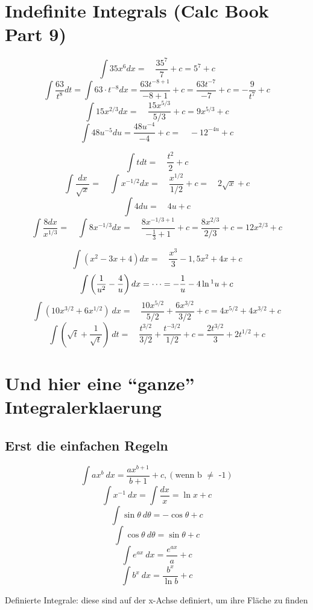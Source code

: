 \documentclass{report}
\begin{document}
\begin{multicols}{2}
\end{multicols}


\section{Indefinite Integrals (Calc Book Part 9)}

\[\int 35 x^6 dx =\quad \frac{35^7}{7}+c = 5^7+c\]
\[\int \frac{63}{t^8}dt = \int 63\cdot t^{-8} dx = \frac{63t^{-8+1}}{-8+1}+c= \frac{63t^{-7}}{-7}+c = -\frac{9}{t^7}+c\]
\[\int 15x^{2/3}dx=\quad \frac{15x^{5/3}}{5/3}+c = 9x^{5/3}+c\]
\[\int 48u^{-5}du= \frac{48u^{-4}}{-4}+c =\quad -12^{-4u}+c\]

\[\int t dt =\quad \frac{t^2}{2}+c\]
\[\int \frac{dx}{\sqrt{x}}=\quad \int x^{-1/2}dx =\quad \frac{x^{1/2}}{1/2}+c=\quad 2\sqrt{x}+c\]
\[\int 4 du =\quad 4u+c\]
\[\int \frac{8dx}{x^{1/3}} =\quad \int 8x^{-1/3}dx =\quad \frac{8x^{-1/3+1}}{-\frac{1}{3}+1}+c = \frac{8x^{2/3}}{2/3}+c = 12x^{2/3}+c \]

\[\int (x^2-3x+4)dx =\quad \frac{x^3}{3}-1,5x^2+4x+c\]
\[\int \left(\frac{1}{u^2}-\frac{4}{u}\right)dx = \dots = -\frac{1}{u}-4\ln\footnote{Recall that a power of $b=-1$ is a special case : $\int \frac{du}{u}=\int u^{-1}du=\ln u+c$} u+c \]
\[\int (10x^{3/2}+6x^{1/2})\ dx =\quad \frac{10x^{5/2}}{5/2}+\frac{6x^{3/2}}{3/2}+c = 4x^{5/2}+4x^{3/2}+c\]
\[\int \left(\sqrt{t}+\frac{1}{\sqrt{t}}\right)\ dt =\quad \frac{t^{3/2}}{3/2}+\frac{t^{-3/2}}{1/2}+c= \frac{2t^{3/2}}{3}+2t^{1/2}+c \]

\clearpage

\section{Und hier eine ``ganze'' Integralerklaerung}
\begin{multicols*}{2}
  \subsection{Erst die einfachen Regeln}
  \[\int ax^b\ dx= \frac{ax^{b+1}}{b+1}+c, (\text{wenn b $\ne$ -1})\]
  \[\int x^{-1}\ dx = \int \frac{dx}{x} = \ln x + c\]
  \[\int \sin \theta\ d\theta = -\cos \theta + c\]
  \[\int \cos \theta\ d\theta = \sin \theta + c\]
  \[\int e^{ax}\ dx= \frac{e^{ax}}{a}+c\]
  \[\int b^x\ dx = \frac{b^x}{\ln b} + c\]




Definierte Integrale: diese sind auf der x-Achse definiert, um ihre Fl\"ache zu finden








\end{multicols*}
\end{document}
